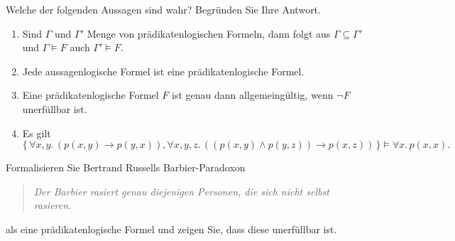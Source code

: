 \documentclass[german]{latteachCD}[2017/03/28]
\begin{document}
\begin{exercise}
  Welche der folgenden Aussagen sind wahr?  Begründen Sie Ihre Antwort.
  \begin{enumerate}
  \item Sind $\Gamma$ und $\Gamma'$ Menge von prädikatenlogischen Formeln, dann
    folgt aus $\Gamma \subseteq \Gamma'$ und $\Gamma \models F$ auch $\Gamma'
    \models F$.
  \item Jede aussagenlogische Formel ist eine prädikatenlogische Formel.
  \item Eine prädikatenlogische Formel $F$ ist genau dann allgemeingültig,
    wenn $\lnot F$ unerfüllbar ist.
  \item Es gilt
    \begin{equation*}
      \{\,\forall x, y.\, (p(x,y) \to p(y,x)), \forall x, y, z.\, ((p(x,y) \land p(y,z))
      \to p(x,z))\,\} \models \forall x.\, p(x,x).
    \end{equation*}
  \end{enumerate}
\end{exercise}

\begin{exercise}
  Formalisieren Sie Bertrand Russells Barbier-Paradoxon
  \begin{quote}
    \emph{Der Barbier rasiert genau diejenigen Personen, die sich nicht selbst rasieren.}
  \end{quote}
  als eine prädikatenlogische Formel und zeigen Sie, dass diese unerfüllbar ist.
\end{exercise}
\end{document}
